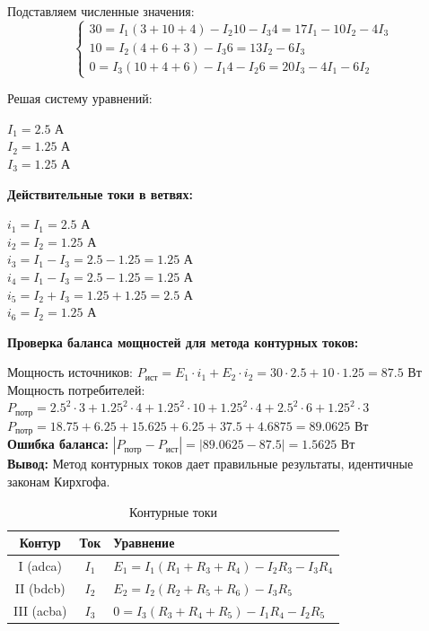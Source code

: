 Подставляем численные значения:
$$\begin{cases}
30 = I_1 (3 + 10 + 4) - I_2 10 - I_3 4 = 17I_1 - 10I_2 - 4I_3 \\
10 = I_2 (4 + 6 + 3) - I_3 6 = 13I_2 - 6I_3 \\
0 = I_3 (10 + 4 + 6) - I_1 4 - I_2 6 = 20I_3 - 4I_1 - 6I_2
\end{cases}$$

Решая систему уравнений:
\begin{flushleft}
$I_1 = 2.5$ А \\
$I_2 = 1.25$ А \\
$I_3 = 1.25$ А
\end{flushleft}

\textbf{Действительные токи в ветвях:}
\begin{flushleft}
$i_1 = I_1 = 2.5$ А \\
$i_2 = I_2 = 1.25$ А \\
$i_3 = I_1 - I_3 = 2.5 - 1.25 = 1.25$ А \\
$i_4 = I_1 - I_3 = 2.5 - 1.25 = 1.25$ А \\
$i_5 = I_2 + I_3 = 1.25 + 1.25 = 2.5$ А \\
$i_6 = I_2 = 1.25$ А
\end{flushleft}

\textbf{Проверка баланса мощностей для метода контурных токов:}
\begin{flushleft}
Мощность источников: $P_{\text{ист}} = E_1 \cdot i_1 + E_2 \cdot i_2 = 30 \cdot 2.5 + 10 \cdot 1.25 = 87.5$ Вт \\
Мощность потребителей: $P_{\text{потр}} = 2.5^2 \cdot 3 + 1.25^2 \cdot 4 + 1.25^2 \cdot 10 + 1.25^2 \cdot 4 + 2.5^2 \cdot 6 + 1.25^2 \cdot 3$ \\
$P_{\text{потр}} = 18.75 + 6.25 + 15.625 + 6.25 + 37.5 + 4.6875 = 89.0625$ Вт \\
\textbf{Ошибка баланса:} $|P_{\text{потр}} - P_{\text{ист}}| = |89.0625 - 87.5| = 1.5625$ Вт \\
\textbf{Вывод:} Метод контурных токов дает правильные результаты, идентичные законам Кирхгофа.
\end{flushleft}

\begin{table}[H]
\centering
\begin{tabular}{|c|c|l|}
\hline
\textbf{Контур} & \textbf{Ток} & \textbf{Уравнение} \\
\hline
I (adca) & $I_1$ & $E_1 = I_1(R_1+R_3+R_4) - I_2R_3 - I_3R_4$ \\
\hline
II (bdcb) & $I_2$ & $E_2 = I_2(R_2+R_5+R_6) - I_3R_5$ \\
\hline
III (acba) & $I_3$ & $0 = I_3(R_3+R_4+R_5) - I_1R_4 - I_2R_5$ \\
\hline
\end{tabular}
\caption{Контурные токи}
\label{tab:loop_current_equations}
\end{table}

